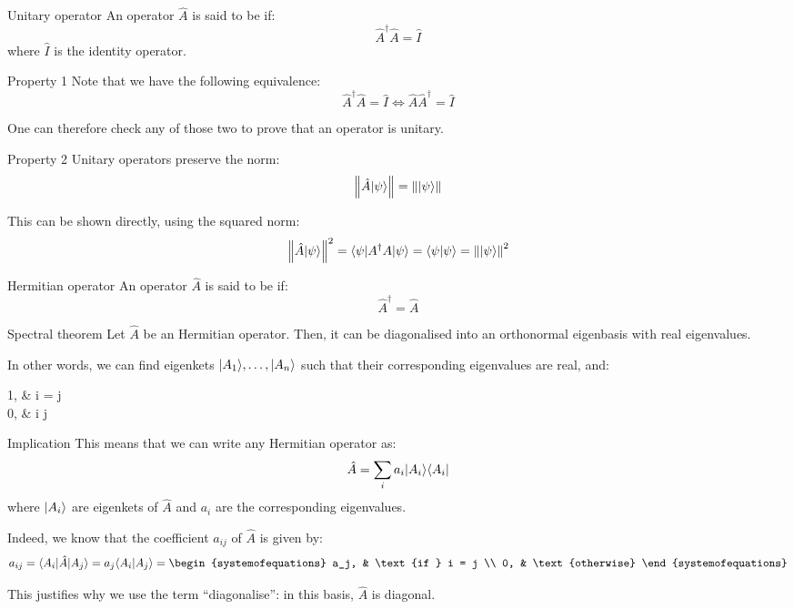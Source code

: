 \documentclass[a4paper]{article}
\begin{document}
\begin{parag}{Unitary operator}
    An operator $\hat{A}$ is said to be  if: 
    \[\hat{A}^{\dagger} \hat{A} = \hat{I}\]
    where $\hat{I}$ is the identity operator.

    \begin{subparag}{Property 1}
        Note that we have the following equivalence: 
        \[\hat{A}^{\dagger} \hat{A} = \hat{I} \iff \hat{A} \hat{A}^{\dagger} = \hat{I}\]
        
        One can therefore check any of those two to prove that an operator is unitary.
    \end{subparag}

    \begin{subparag}{Property 2}
        Unitary operators preserve the norm: 
        \[\left\|\hat{A} \ket{\psi}\right\| = \left\|\ket{\psi}\right\|\]

        This can be shown directly, using the squared norm: 
        \[\left\|\hat{A}\ket{\psi}\right\|^2 = \bra{\psi} A^{\dagger} A \ket{\psi} = \braket{\psi}{\psi} = \left\|\ket{\psi}\right\|^2\]
    \end{subparag}
\end{parag}

\begin{parag}{Hermitian operator}
    An operator $\hat{A}$ is said to be  if: 
    \[\hat{A}^{\dagger} = \hat{A}\]
\end{parag}

\begin{parag}{Spectral theorem}
    Let $\hat{A}$ be an Hermitian operator. Then, it can be diagonalised into an orthonormal eigenbasis with real eigenvalues.

    In other words, we can find eigenkets $\ket{A_1}, \ldots, \ket{A_n}$ such that their corresponding eigenvalues are real, and: 
    \begin{functionbypart}{}
        1, &  i = j \\
        0, &  i \neq j
    \end{functionbypart}

    \begin{subparag}{Implication}
        This means that we can write any Hermitian operator as: 
        \[\hat{A} = \sum_{i} a_i \ket{A_i}\bra{A_i}\]
        where $\ket{A_i}$ are eigenkets of $\hat{A}$ and $a_i$ are the corresponding eigenvalues.

        Indeed, we know that the coefficient $a_{ij}$ of $\hat{A}$ is given by: 
        \[a_{ij} = \bra{A_i} \hat{A} \ket{A_j} = a_j \braket{A_i}{A_j} = \begin{systemofequations} a_j, & \text{if } i = j \\ 0, & \text{otherwise} \end{systemofequations}\]
        
        This justifies why we use the term ``diagonalise'': in this basis, $\hat{A}$ is diagonal.
    \end{subparag}
\end{parag}
\end{document}
